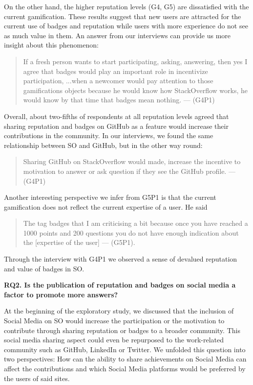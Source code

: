 \documentclass{sigchi}
\begin{document}
On the other hand, the higher reputation levels (G4, G5) are dissatisfied with the current gamification. These results suggest that new users are attracted for the current use of badges and reputation while users with more experience do not see as much value in them. An answer from our interviews can provide us more insight about this phenomenon:

\begin{quote}
If a fresh person wants to start participating, asking, answering, then yes I agree that badges would play an important role in incentivize participation, ...when a newcomer would pay attention to those gamifications objects because he would know how StackOverflow works, he would know by that time that badges mean nothing. --- (G4P1)
\end{quote}

Overall, about two-fifths of respondents at all reputation levels agreed that sharing reputation and badges on GitHub as a feature would increase their contributions in the community. In our interviews, we found the same relationship between SO and GitHub, but in the other way round:

\begin{quote}
Sharing GitHub on StackOverflow would made, increase the incentive to motivation to answer or ask question if they see the GitHub profile. --- (G4P1)
\end{quote}

Another interesting perspective we infer from G5P1 is that the current gamification does not reflect the current expertise of a user. He said
\begin{quote}
The tag badges that I am criticising a bit because once you have reached a 1000 points and 200 questions you do not have enough indication about the [expertise of the user] --- (G5P1).
\end{quote}

Through the interview with G4P1 we observed a sense of devalued reputation and value of badges in SO.

\textbf{RQ2. Is the publication of reputation and badges on social media a factor to promote more answers?}

At the beginning of the exploratory study, we discussed that the inclusion of Social Media on SO would increase the participation or the motivation to contribute through sharing reputation or badges to a broader community. This social media sharing aspect could even be repurposed to the work-related community such as GitHub, LinkedIn or Twitter. We unfolded this question into two perspectives: How can the ability to share achievements on Social Media can affect the contributions and which Social Media platforms would be preferred by the users of said sites.
\end{document}
